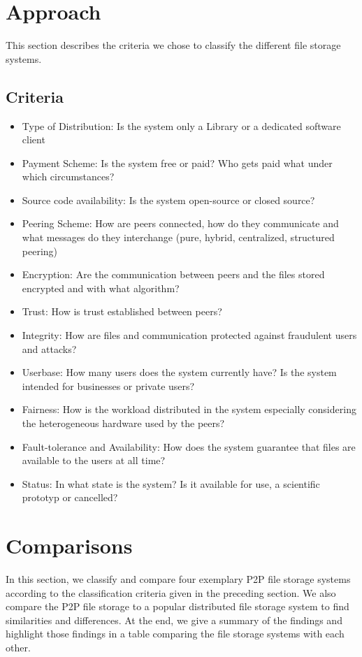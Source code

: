 \section{Approach} This section describes the criteria we chose to classify the
different file storage systems.

\subsection{Criteria}
\begin{itemize}
\item Type of Distribution: Is the system only a Library or a dedicated software client
\item Payment Scheme: Is the system free or paid? Who gets paid what under which circumstances?
\item Source code availability: Is the system open-source or closed source?
\item Peering Scheme: How are peers connected, how do they communicate and what messages do they interchange (pure, hybrid, centralized, structured peering)
\item Encryption: Are the communication between peers and the files stored encrypted and with what algorithm?
\item Trust: How is trust established between peers?
\item Integrity: How are files and communication protected against fraudulent users and attacks?
\item Userbase: How many users does the system currently have? Is the system intended for businesses or private users?
\item Fairness: How is the workload distributed in the system especially considering the heterogeneous hardware used by the peers? 
\item Fault-tolerance and Availability: How does the system guarantee that files are available to the users at all time? 
\item Status: In what state is the system? Is it available for use, a scientific prototyp or cancelled?
\end{itemize}

\section{Comparisons} In this section, we classify and compare four exemplary
P2P file storage systems according to the classification criteria given in the
preceding section. We also compare the P2P file storage to a popular distributed
file storage system to find similarities and differences. At the end, we give a
summary of the findings and highlight those findings in a table comparing the
file storage systems with each other.

